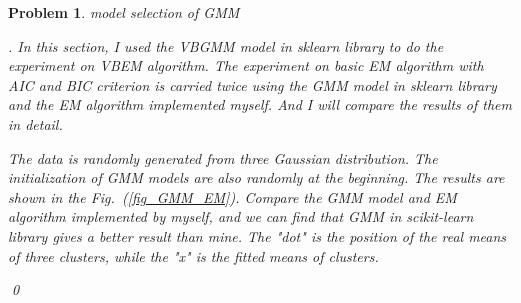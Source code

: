 \documentclass[12pt]{article}
\newtheorem{hw}{Problem}
\newenvironment{sol}
  {\par\vspace{3mm}\noindent{\it Solution}.}
  {\qed}
\begin{document}
\begin{hw}
model selection of GMM
\begin{sol}
	In this section, I used the VBGMM model in sklearn library to do the experiment on VBEM algorithm. The experiment on basic EM algorithm with AIC and BIC criterion is carried twice using the GMM model in sklearn library and the EM algorithm implemented myself. And I will compare the results of them in detail.

	The data is randomly generated from three Gaussian distribution. The initialization of GMM models are also randomly at the beginning. The results are shown in the Fig.~(\ref{fig_GMM_EM}). Compare the GMM model and EM algorithm implemented by myself, and we can find that GMM in scikit-learn library gives a better result than mine. The "dot" is the position of the real means of three clusters, while the "x" is the fitted means of clusters. 


\end{sol}
\end{hw}
\end{document}
